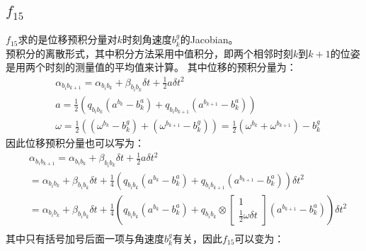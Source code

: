 \documentclass[UTF8]{ctexart}
\begin{document}
\subsection{$f_{15}$}
\indent $f_{15}$求的是位移预积分量对$k$时刻角速度$b_k^g$的Jacobian。\\
\indent 预积分的离散形式，其中积分方法采用中值积分，即两个相邻时刻$k$到$k+1$的位姿是用两个时刻的测量值的平均值来计算。
其中位移的预积分量为：\\
\begin{equation}
\begin{aligned}
&\alpha_{b_ib_{k+1}}=\alpha_{b_ib_k}+\beta_{b_ib_k}\delta t+\frac{1}{2}a \delta t^2\\
&a=\frac{1}{2}(q_{b_ib_k}(a^{b_k}-b_k^a)+q_{b_ib_{k+1}}(a^{b_{k+1}}-b_k^a))\\
&\omega=\frac{1}{2}((\omega^{b_k}-b_k^g)+(\omega^{b_{k+1}}-b_k^g))=\frac{1}{2}(\omega^{b_k}+\omega^{b_{k+1}})-b_k^g
\end{aligned}
\end{equation}
\indent 因此位移预积分量也可以写为：\\
\begin{equation}
\begin{aligned}
&\alpha_{b_ib_{k+1}}=\alpha_{b_ib_k}+\beta_{b_ib_k}\delta t+\frac{1}{2}a \delta t^2\\
&=\alpha_{b_ib_k}+\beta_{b_ib_k}\delta t+\frac{1}{4}(q_{b_ib_k}(a^{b_k}-b_k^a)+q_{b_ib_{k+1}}(a^{b_{k+1}}-b_k^a))\delta t^2\\
&=\alpha_{b_ib_k}+\beta_{b_ib_k}\delta t+\frac{1}{4}(q_{b_ib_k}(a^{b_k}-b_k^a)+q_{b_ib_k}\otimes
\left[\begin{array}{cccc} 
1 \\
\frac{1}{2}\omega\delta t
\end{array}\right] (a^{b_{k+1}}-b_k^a))\delta t^2\\
\end{aligned}
\end{equation}
\indent 其中只有括号加号后面一项与角速度$b_k^g$有关，因此$f_{15}$可以变为：\\
\end{document}

